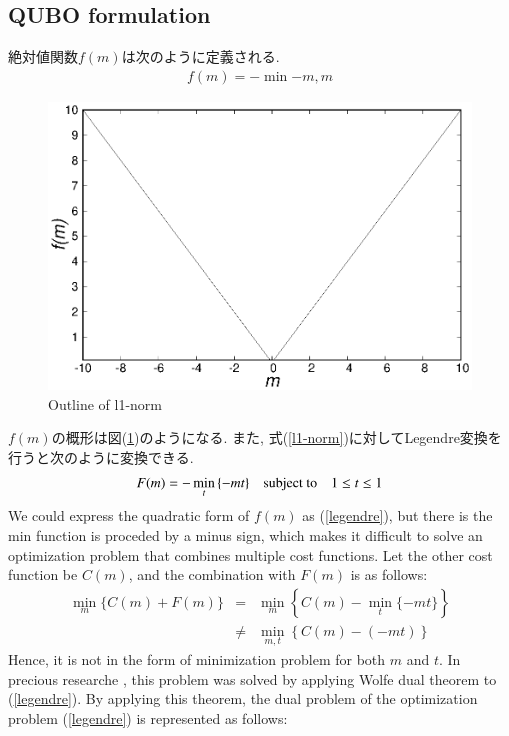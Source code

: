 \documentclass[fp,twocolumn]{jpsj3}
\begin{document}
\subsection{QUBO formulation}
絶対値関数$f(m)$は次のように定義される.
\begin{eqnarray}
  f(m)=-\min{-m,m} \label{l1-norm}
\end{eqnarray}
\begin{figure}[htbp]
  \begin{center}
    \includegraphics[keepaspectratio,scale=0.50]{absolute.eps}
    \caption{Outline of l1-norm}
    \label{fig:absolute}
  \end{center}
\end{figure}
$f(m)$の概形は図(\ref{fig:absolute})のようになる. また, 式(\ref{l1-norm})に対してLegendre変換を行うと次のように変換できる. 
\begin{eqnarray}
  F(m)=-\min_{t}{\{-mt\}} \quad \text{subject to} \quad \-1 \leq t \leq 1 \label{legendre}
\end{eqnarray}
We could express the quadratic form of $f(m)$ as (\ref{legendre}), but there is the min function is proceded by a minus sign, which makes it difficult to solve an optimization problem that combines multiple cost functions. Let the other cost function be $C(m)$, and the combination with $F(m)$ is as follows:
\begin{eqnarray}
  \min_{m}{\{C(m)+F(m)\}} &=& \min_{m}\left\{C(m)-\min_{t}{\{-mt\}}\right\} \nonumber \\
  &\neq & \min_{m,t}{\left\{C(m)-(-mt)\right\}} \nonumber 
\end{eqnarray}
Hence, it is not in the form of minimization problem for both $m$ and $t$.
In precious researche \cite{relu}, this problem was solved by applying Wolfe dual theorem to (\ref{legendre}). By applying this theorem, the dual problem of the optimization problem (\ref{legendre}) is represented as follows:
\end{document}
